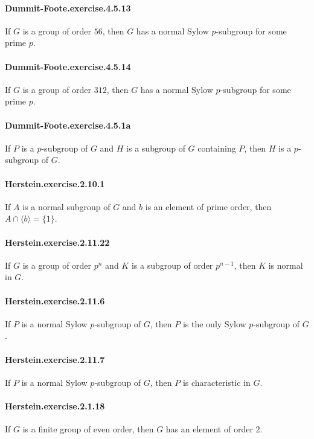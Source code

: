 \documentclass{article}
\begin{document}
\paragraph{Dummit-Foote.exercise.4.5.13} If $G$ is a group of order $56$, then $G$ has a normal Sylow $p$-subgroup for some prime $p$.

\paragraph{Dummit-Foote.exercise.4.5.14} If $G$ is a group of order $312$, then $G$ has a normal Sylow $p$-subgroup for some prime $p$.

\paragraph{Dummit-Foote.exercise.4.5.1a} If $P$ is a $p$-subgroup of $G$ and $H$ is a subgroup of $G$ containing $P$, then $H$ is a $p$-subgroup of $G$.

\paragraph{Herstein.exercise.2.10.1} If $A$ is a normal subgroup of $G$ and $b$ is an element of prime order, then $A\cap \langle b\rangle = \{1\}$.

\paragraph{Herstein.exercise.2.11.22} If $G$ is a group of order $p^n$ and $K$ is a subgroup of order $p^{n-1}$, then $K$ is normal in $G$.

\paragraph{Herstein.exercise.2.11.6} If $P$ is a normal Sylow $p$-subgroup of $G$, then $P$ is the only Sylow $p$-subgroup of $G$.

\paragraph{Herstein.exercise.2.11.7} If $P$ is a normal Sylow $p$-subgroup of $G$, then $P$ is characteristic in $G$.

\paragraph{Herstein.exercise.2.1.18} If $G$ is a finite group of even order, then $G$ has an element of order $2$.
\end{document}
